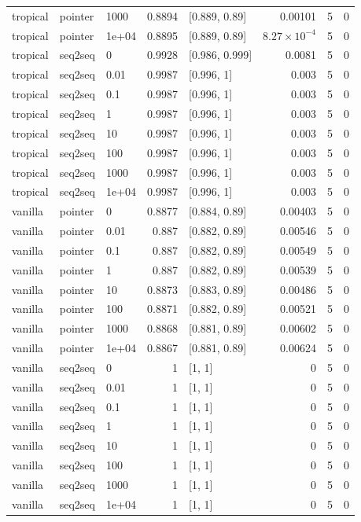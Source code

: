 \documentclass[10pt]{article}
\begin{document}
{\begin{longtable}{lllrlrrr}
tropical & pointer & 1000 & 0.8894 & [0.889, 0.89] & 0.00101 & 5 & 0\\
tropical & pointer & 1e+04 & 0.8895 & [0.889, 0.89] & $8.27\times10^{-4}$ & 5 & 0\\
tropical & seq2seq & 0 & 0.9928 & [0.986, 0.999] & 0.0081 & 5 & 0\\
tropical & seq2seq & 0.01 & 0.9987 & [0.996, 1] & 0.003 & 5 & 0\\
tropical & seq2seq & 0.1 & 0.9987 & [0.996, 1] & 0.003 & 5 & 0\\
tropical & seq2seq & 1 & 0.9987 & [0.996, 1] & 0.003 & 5 & 0\\
tropical & seq2seq & 10 & 0.9987 & [0.996, 1] & 0.003 & 5 & 0\\
tropical & seq2seq & 100 & 0.9987 & [0.996, 1] & 0.003 & 5 & 0\\
tropical & seq2seq & 1000 & 0.9987 & [0.996, 1] & 0.003 & 5 & 0\\
tropical & seq2seq & 1e+04 & 0.9987 & [0.996, 1] & 0.003 & 5 & 0\\
vanilla & pointer & 0 & 0.8877 & [0.884, 0.89] & 0.00403 & 5 & 0\\
vanilla & pointer & 0.01 & 0.887 & [0.882, 0.89] & 0.00546 & 5 & 0\\
vanilla & pointer & 0.1 & 0.887 & [0.882, 0.89] & 0.00549 & 5 & 0\\
vanilla & pointer & 1 & 0.887 & [0.882, 0.89] & 0.00539 & 5 & 0\\
vanilla & pointer & 10 & 0.8873 & [0.883, 0.89] & 0.00486 & 5 & 0\\
vanilla & pointer & 100 & 0.8871 & [0.882, 0.89] & 0.00521 & 5 & 0\\
vanilla & pointer & 1000 & 0.8868 & [0.881, 0.89] & 0.00602 & 5 & 0\\
vanilla & pointer & 1e+04 & 0.8867 & [0.881, 0.89] & 0.00624 & 5 & 0\\
vanilla & seq2seq & 0 & 1 & [1, 1] & 0 & 5 & 0\\
vanilla & seq2seq & 0.01 & 1 & [1, 1] & 0 & 5 & 0\\
vanilla & seq2seq & 0.1 & 1 & [1, 1] & 0 & 5 & 0\\
vanilla & seq2seq & 1 & 1 & [1, 1] & 0 & 5 & 0\\
vanilla & seq2seq & 10 & 1 & [1, 1] & 0 & 5 & 0\\
vanilla & seq2seq & 100 & 1 & [1, 1] & 0 & 5 & 0\\
vanilla & seq2seq & 1000 & 1 & [1, 1] & 0 & 5 & 0\\
vanilla & seq2seq & 1e+04 & 1 & [1, 1] & 0 & 5 & 0\\
\bottomrule
\end{longtable}
}
\end{document}
